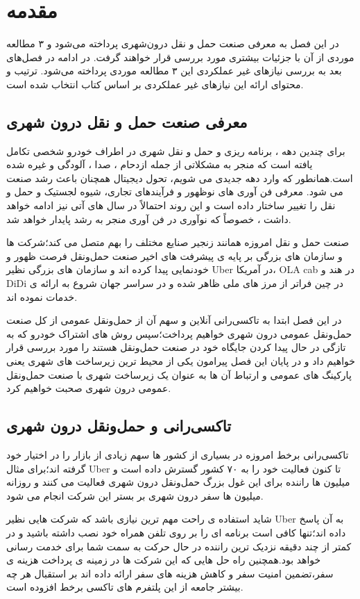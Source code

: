 \chapter{مقدمه}
در این فصل به معرفی صنعت حمل و نقل درون‌شهری پرداخته می‌شود و ۳ مطالعه موردی از آن با جزئیات بیشتری مورد بررسی قرار خواهند گرفت. در ادامه در فصل‌های بعد به بررسی نیازهای غیر عملکردی  این ۳ مطالعه موردی پرداخته می‌شود. ترتیب و محتوای ارائه این نیازهای غیر عملکردی بر اساس کتاب \cite{bass2003software} انتخاب شده است.

\section{معرفی صنعت حمل و نقل درون شهری}
برای چندین دهه ، برنامه ریزی و حمل و نقل شهری در اطراف خودرو شخصی تکامل یافته است که منجر به مشکلاتی از جمله ازدحام ، صدا ، آلودگی و غیره شده است.همانطور که وارد دهه جدیدی می شویم، تحول دیجیتال همچنان باعث رشد صنعت می شود. معرفی فن آوری های نوظهور و فرآیندهای تجاری، شیوه لجستیک و حمل و نقل را تغییر ساختار داده است و این روند احتمالاً در سال های آتی نیز ادامه خواهد داشت ، خصوصاً که نوآوری در فن آوری منجر به رشد پایدار خواهد شد.

صنعت حمل و نقل امروزه همانند زنجیر صنایع مختلف را بهم متصل می کند؛‌شرکت ها و سازمان های بزرگی بر پایه ی پیشرفت های اخیر صنعت حمل‌و‌نقل فرصت ظهور و خودنمایی پیدا کرده اند و سازمان های بزرگی نظیر Uber در آمریکا، OLA cab در هند و DiDi در چین فراتر از مرز های ملی ظاهر شده و در سراسر جهان شروع به ارائه ی خدمات نموده اند.

در این فصل ابتدا به تاکسی‌رانی آنلاین و سهم آن از حمل‌و‌نقل عمومی از کل صنعت حمل‌و‌نقل عمومی درون شهری خواهیم پرداخت؛سپس روش های اشتراک خودرو که به تازگی در حال پیدا کردن جایگاه خود در صنعت حمل‌و‌نقل هستند را مورد بررسی قرار خواهیم داد و در پایان این فصل پیرامون یکی از محیط ترین زیرساخت های شهری یعنی پارکینگ های عمومی و ارتباط آن ها به عنوان یک زیرساخت شهری با صنعت حمل‌و‌نقل عمومی درون شهری صحبت خواهیم کرد.
\section{تاکسی‌رانی و حمل‌و‌نقل درون شهری}
تاکسی‌رانی برخط  امروزه در بسیاری از کشور ها سهم زیادی از بازار را در اختیار خود گرفته اند؛برای مثال Uber تا کنون فعالیت خود را به ۷۰ کشور گسترش داده است و میلیون ها راننده برای این غول بزرگ حمل‌و‌نقل درون شهری فعالیت می کنند و روزانه میلیون ها سفر درون شهری بر بستر این شرکت انجام می شود.

شاید استفاده ی راحت مهم ترین نیازی باشد که شرکت هایی نظیر Uber به آن پاسخ داده اند؛تنها کافی است برنامه ای را بر روی تلفن همراه خود نصب داشته باشید و در کمتر از چند دقیقه نزدیک ترین راننده در حال حرکت به سمت شما برای خدمت رسانی خواهد بود.همچنین راه حل هایی که این شرکت ها در زمینه ی پرداخت هزینه ی سفر،‌تضمین امنیت سفر و کاهش هزینه های سفر ارائه داده اند بر استقبال هر چه بیشتر جامعه از این پلتفرم  های تاکسی برخط افزوده است.

